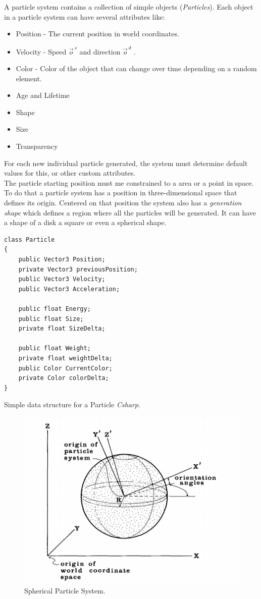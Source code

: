 A particle system contains a collection of simple objects (\emph{Particles}). Each object in a particle system can have several attributes like:
\begin{itemize}
\item Position - The current position in world coordinates.
\item Velocity - Speed $\vec{o}^{\,s}$ and direction $\vec{o}^{\,d}$ .
\item Color - Color of the object that can change over time depending on a random element.
\item Age and Lifetime 
\item Shape
\item Size
\item Transparency
\end{itemize}
For each new individual particle generated, the system must determine default values for this, or other custom attributes.
\\ The particle starting position must me constrained to a area or a point in space. To do that a particle system has a position in three-dimensional space that defines its origin. Centered on that position the system also has a \emph{generation shape} which defines a region where all the particles will be generated. It can have a shape of a disk a square or even a spherical shape.

\begin{lstlisting}
class Particle
{
	public Vector3 Position;
	private Vector3 previousPosition;
	public Vector3 Velocity;
	public Vector3 Acceleration;
	
	public float Energy;
	public float Size;
	private float SizeDelta;
	
	public float Weight;
	private float weightDelta;
	public Color CurrentColor;
	private Color colorDelta;
}
\end{lstlisting}
Simple data structure for a Particle \emph{Csharp}.

\begin{figure}
  \includegraphics{particleSystem}
  \caption{Spherical Particle System.}
  \label{fig:one}
\end{figure}

